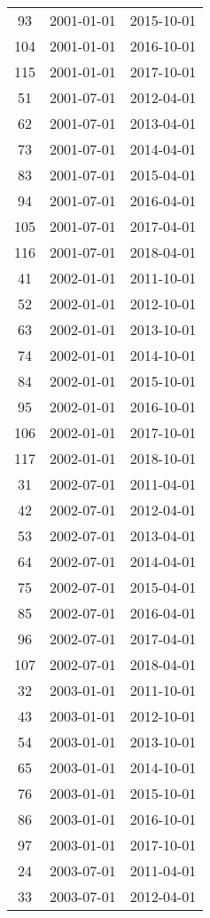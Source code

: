 \begin{tabular}{ccc}
  93 & 2001-01-01 & 2015-10-01 \\ 
  104 & 2001-01-01 & 2016-10-01 \\ 
  115 & 2001-01-01 & 2017-10-01 \\ 
  51 & 2001-07-01 & 2012-04-01 \\ 
  62 & 2001-07-01 & 2013-04-01 \\ 
  73 & 2001-07-01 & 2014-04-01 \\ 
  83 & 2001-07-01 & 2015-04-01 \\ 
  94 & 2001-07-01 & 2016-04-01 \\ 
  105 & 2001-07-01 & 2017-04-01 \\ 
  116 & 2001-07-01 & 2018-04-01 \\ 
  41 & 2002-01-01 & 2011-10-01 \\ 
  52 & 2002-01-01 & 2012-10-01 \\ 
  63 & 2002-01-01 & 2013-10-01 \\ 
  74 & 2002-01-01 & 2014-10-01 \\ 
  84 & 2002-01-01 & 2015-10-01 \\ 
  95 & 2002-01-01 & 2016-10-01 \\ 
  106 & 2002-01-01 & 2017-10-01 \\ 
  117 & 2002-01-01 & 2018-10-01 \\ 
  31 & 2002-07-01 & 2011-04-01 \\ 
  42 & 2002-07-01 & 2012-04-01 \\ 
  53 & 2002-07-01 & 2013-04-01 \\ 
  64 & 2002-07-01 & 2014-04-01 \\ 
  75 & 2002-07-01 & 2015-04-01 \\ 
  85 & 2002-07-01 & 2016-04-01 \\ 
  96 & 2002-07-01 & 2017-04-01 \\ 
  107 & 2002-07-01 & 2018-04-01 \\ 
  32 & 2003-01-01 & 2011-10-01 \\ 
  43 & 2003-01-01 & 2012-10-01 \\ 
  54 & 2003-01-01 & 2013-10-01 \\ 
  65 & 2003-01-01 & 2014-10-01 \\ 
  76 & 2003-01-01 & 2015-10-01 \\ 
  86 & 2003-01-01 & 2016-10-01 \\ 
  97 & 2003-01-01 & 2017-10-01 \\ 
  24 & 2003-07-01 & 2011-04-01 \\ 
  33 & 2003-07-01 & 2012-04-01 \\ 

\end{tabular}
